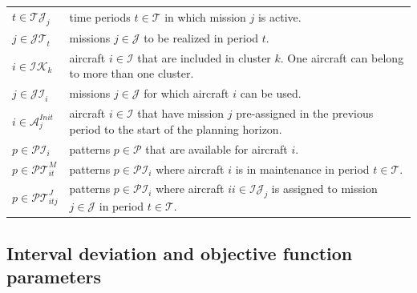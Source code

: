 \documentclass[a4paper,11pt]{article}
\begin{document}
        \begin{tabular}{p{15mm}p{140mm}}
          $t \in \mathcal{TJ}_j$     &  time periods $t \in \mathcal{T}$ in which mission $j$ is active. \\
          $j \in \mathcal{JT}_t$    &  missions $j \in \mathcal{J}$ to be realized in period $t$. \\
          $i \in \mathcal{IK}_k$     &  aircraft $i \in \mathcal{I}$ that are included in cluster $k$. One aircraft can belong to more than one cluster. \\
          $j \in \mathcal{JI}_i$     &  missions $j \in \mathcal{J}$ for which aircraft $i$ can be used. \\
          $i \in \mathcal{A}^{Init}_j$  & aircraft $i \in \mathcal{I}$ that have mission $j$ pre-assigned in the previous period to the start of the planning horizon. \\
          $p \in \mathcal{PI}_i$     &  patterns $p \in \mathcal{P}$ that are available for aircraft $i$. \\
          $p \in \mathcal{PT}^{M}_{it}$     &  patterns $p \in \mathcal{PI}_i$ where aircraft $i$ is in maintenance in period $t \in \mathcal{T}$. \\
          $p \in \mathcal{PT}^{J}_{itj}$     &  patterns $p \in \mathcal{PI}_i$ where aircraft $i i \in \mathcal{IJ}_j$ is assigned to mission $j \in \mathcal{J}$ in period $t \in \mathcal{T}$. \\
        \end{tabular}

    \subsection{Interval deviation and objective function parameters}
\end{document}
